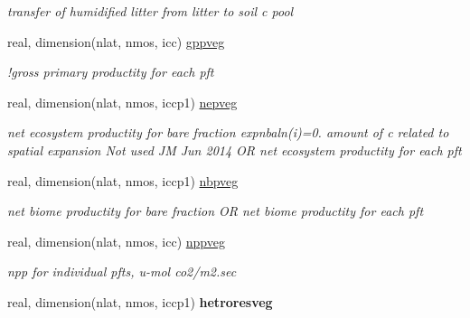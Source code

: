 \begin{DoxyCompactItemize}
\begin{DoxyCompactList}\small\item\em transfer of humidified litter from litter to soil c pool \end{DoxyCompactList}\item 
\hypertarget{structctem__statevars_1_1veg__rot_a3eed6aeeece399d2477da3dd5b05119b}{}real, dimension(nlat, nmos, icc) \hyperlink{structctem__statevars_1_1veg__rot_a3eed6aeeece399d2477da3dd5b05119b}{gppveg}\label{structctem__statevars_1_1veg__rot_a3eed6aeeece399d2477da3dd5b05119b}

\begin{DoxyCompactList}\small\item\em !gross primary productity for each pft \end{DoxyCompactList}\item 
\hypertarget{structctem__statevars_1_1veg__rot_adca59caa4a750064c8dd49b7814f2c53}{}real, dimension(nlat, nmos, iccp1) \hyperlink{structctem__statevars_1_1veg__rot_adca59caa4a750064c8dd49b7814f2c53}{nepveg}\label{structctem__statevars_1_1veg__rot_adca59caa4a750064c8dd49b7814f2c53}

\begin{DoxyCompactList}\small\item\em net ecosystem productity for bare fraction expnbaln(i)=0. amount of c related to spatial expansion Not used J\+M Jun 2014 O\+R net ecosystem productity for each pft \end{DoxyCompactList}\item 
\hypertarget{structctem__statevars_1_1veg__rot_a50a88495dadd27ec7030c375b76a3873}{}real, dimension(nlat, nmos, iccp1) \hyperlink{structctem__statevars_1_1veg__rot_a50a88495dadd27ec7030c375b76a3873}{nbpveg}\label{structctem__statevars_1_1veg__rot_a50a88495dadd27ec7030c375b76a3873}

\begin{DoxyCompactList}\small\item\em net biome productity for bare fraction O\+R net biome productity for each pft \end{DoxyCompactList}\item 
\hypertarget{structctem__statevars_1_1veg__rot_a9b9ba458a344154b99214635a16d11d3}{}real, dimension(nlat, nmos, icc) \hyperlink{structctem__statevars_1_1veg__rot_a9b9ba458a344154b99214635a16d11d3}{nppveg}\label{structctem__statevars_1_1veg__rot_a9b9ba458a344154b99214635a16d11d3}

\begin{DoxyCompactList}\small\item\em npp for individual pfts, u-\/mol co2/m2.\+sec \end{DoxyCompactList}\item 
\hypertarget{structctem__statevars_1_1veg__rot_a6fa2fd71c16c05ee48ae5e37446923bd}{}real, dimension(nlat, nmos, iccp1) {\bfseries hetroresveg}\label{structctem__statevars_1_1veg__rot_a6fa2fd71c16c05ee48ae5e37446923bd}


\end{DoxyCompactItemize}
